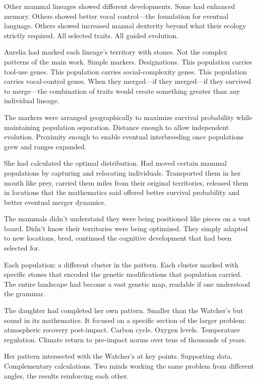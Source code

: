Other mammal lineages showed different developments. Some had enhanced memory. Others showed better vocal control—the foundation for eventual language. Others showed increased manual dexterity beyond what their ecology strictly required. All selected traits. All guided evolution.

Aurelia had marked each lineage's territory with stones. Not the complex patterns of the main work. Simple markers. Designations. This population carries tool-use genes. This population carries social-complexity genes. This population carries vocal-control genes. When they merged—if they merged—if they survived to merge—the combination of traits would create something greater than any individual lineage.

The markers were arranged geographically to maximize survival probability while maintaining population separation. Distance enough to allow independent evolution. Proximity enough to enable eventual interbreeding once populations grew and ranges expanded.

She had calculated the optimal distribution. Had moved certain mammal populations by capturing and relocating individuals. Transported them in her mouth like prey, carried them miles from their original territories, released them in locations that the mathematics said offered better survival probability and better eventual merger dynamics.

The mammals didn't understand they were being positioned like pieces on a vast board. Didn't know their territories were being optimized. They simply adapted to new locations, bred, continued the cognitive development that had been selected for.

Each population: a different cluster in the pattern. Each cluster marked with specific stones that encoded the genetic modifications that population carried. The entire landscape had become a vast genetic map, readable if one understood the grammar.

\scenebreak

The daughter had completed her own pattern. Smaller than the Watcher's but sound in its mathematics. It focused on a specific section of the larger problem: atmospheric recovery post-impact. Carbon cycle. Oxygen levels. Temperature regulation. Climate return to pre-impact norms over tens of thousands of years.

Her pattern intersected with the Watcher's at key points. Supporting data. Complementary calculations. Two minds working the same problem from different angles, the results reinforcing each other.

